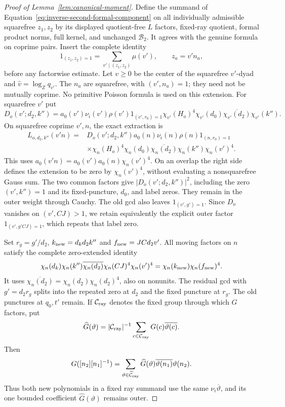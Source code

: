 \documentclass[12pt]{article}
\begin{document}
\begin{proof}[Proof of Lemma~\ref{lem:canonical-moment}]
Define the summand of Equation~\eqref{eq:inverse-second-formal-component}
on all individually admissible squarefree \(z_1,z_2\) by its displayed
quotient-free \(L\) factors, fixed-ray quotient, formal product norms,
full kernel, and unchanged \(\mathcal B_2\).  It agrees with the
genuine formula on coprime pairs.  Insert the complete identity
\[
 1_{(z_1,z_2)=1}=\sum_{v'\mid(z_1,z_2)}\mu(v'),\qquad z_a=v'n_a,
\]
before any factorwise estimate.  Let \(v\ge0\) be the center of the
squarefree \(v'\)-dyad and \(\widehat v=\log_Zq_{v'}\).  The
\(n_a\) are squarefree, with \((v',n_a)=1\); they need not be mutually
coprime.  No primitive Poisson formula is used on this extension.
For squarefree \(v'\) put
\[
 D_o(v';d_2,k'')=a_0(v')\nu_i(v')\rho(v')1_{(v',r_0)=1}
   \chi_{v'}(H_o)^4\chi_{v'}(d_0)\overline{\chi_{v'}(d_2)}\chi_{v'}(k'').
\]
On squarefree coprime \(v',n\), the exact extraction is
\begin{equation}\label{eq:inverse-second-extraction}
 \begin{split}
 L_{o,d_2,k''}(v'n)={}&D_o(v';d_2,k'')a_0(n)\nu_i(n)\rho(n)1_{(n,r_0)=1}\\
 &\times\chi_n(H_o)^4\chi_n(d_0)\overline{\chi_n(d_2)}
          \chi_n(k'')\chi_n(v')^4.
 \end{split}
\end{equation}
This uses \(a_0(v'n)=a_0(v')a_0(n)\chi_n(v')^4\).  On an overlap the
right side defines the extension to be zero by \(\chi_n(v')^4\),
without evaluating a nonsquarefree Gauss sum.  The two common factors
give \(|D_o(v';d_2,k'')|^2\), including the zero \((v',k'')=1\) and
its fixed-puncture, \(d_0\), and label zeros.  They remain in the outer
weight through Cauchy.  The old gcd also leaves \(1_{(v',g')=1}\).
Since \(D_o\) vanishes on \((v',CJ)>1\), we retain equivalently the
explicit outer factor \(1_{(v',g'CJ)=1}\), which repeats that label zero.

Set \(r_g=g'/d_2\), \(k_{\rm new}=d_kd_2k''\) and
\(f_{\rm new}=JCd_2v'\).  All moving factors on \(n\) satisfy the
complete zero-extended identity
\begin{equation}\label{eq:inverse-moving-characters}
 \chi_n(d_k)\chi_n(k'')\overline{\chi_n(d_2)}
       \chi_n(CJ)^4\chi_n(v')^4
 =\chi_n(k_{\rm new})\chi_n(f_{\rm new})^4.
\end{equation}
It uses \(\overline{\chi_n(d_2)}=\chi_n(d_2)\chi_n(d_2)^4\), also on
nonunits.  The residual gcd with \(g'=d_2r_g\) splits into the repeated
zero at \(d_2\) and the fixed puncture at \(r_g\).  The old punctures
at \(q_0,t'\) remain.  If \(\mathcal C_{\rm ray}\) denotes the fixed
group through which \(G\) factors, put
\[
 \widehat G(\vartheta)=|\mathcal C_{\rm ray}|^{-1}
       \sum_{c\in\mathcal C_{\rm ray}}G(c)\overline{\vartheta(c)}.
\]
Then
\[
 G([n_2][n_1]^{-1})=\sum_{\vartheta\in\widehat{\mathcal C}_{\rm ray}}
   \widehat G(\vartheta)\overline{\vartheta(n_1)}\vartheta(n_2).
\]
Thus both new polynomials in a fixed ray summand use the same
\(\nu_i\overline\vartheta\), and its one bounded coefficient
\(\widehat G(\vartheta)\) remains outer.


\end{proof}
\end{document}
